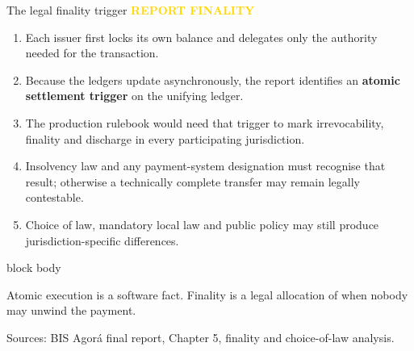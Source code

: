\documentclass[aspectratio=169,12pt]{beamer}
\newcommand{\rust}[1]{\textcolor{Rust}{\textbf{#1}}}
\newcommand{\source}[1]{\vfill\par\fontsize{5.4}{6.5}\selectfont\color{Quiet}Sources: #1}
\newcommand{\tightitems}{\setlength{\itemsep}{0.42em}\setlength{\parskip}{0pt}}
\newcommand{\reporttag}[1]{\textcolor{Gold}{\fontsize{7.2}{8.5}\selectfont\bfseries REPORT #1}}
\newenvironment{statement}{%
  \begin{beamercolorbox}[sep=.18cm,rounded=false,wd=\linewidth]{block body}%
  \fontsize{13}{15.5}\selectfont\bfseries
}{\end{beamercolorbox}}
\begin{document}
\begin{frame}[shrink=30]{The legal finality trigger}
  \reporttag{FINALITY}\par\vspace{0.08cm}
  \begin{enumerate}\tightitems
    \item Each issuer first locks its own balance and delegates only the authority needed for the transaction.
    \item Because the ledgers update asynchronously, the report identifies an \rust{atomic settlement trigger} on the unifying ledger.
    \item The production rulebook would need that trigger to mark irrevocability, finality and discharge in every participating jurisdiction.
    \item Insolvency law and any payment-system designation must recognise that result; otherwise a technically complete transfer may remain legally contestable.
    \item Choice of law, mandatory local law and public policy may still produce jurisdiction-specific differences.
  \end{enumerate}
  \begin{statement}
    Atomic execution is a software fact. Finality is a legal allocation of when nobody may unwind the payment.
  \end{statement}
  \source{BIS Agor\'a final report, Chapter 5, finality and choice-of-law analysis.}
\end{frame}
\end{document}
